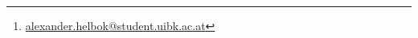 \thispagestyle{empty}
\titlehead{\texttt{[image: logo.jpg]}}
\title{\settitle}
\author{Alexander Helbok\thanks{\href{mailto:alexander.helbok@student.uibk.ac.at}{alexander.helbok@student.uibk.ac.at}}}
\date{\today}
\maketitle
\vfill 
